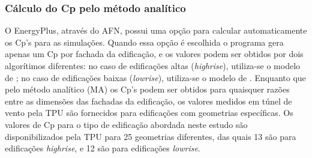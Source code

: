 \documentclass[brazil,hardcopy,openany,a5paper]{ufscthesis}
\begin{document}
%		
%		
%		
		\subsubsection{Cálculo do Cp pelo método analítico}
		
		O EnergyPlus, através do AFN, possui uma opção para calcular automaticamente os Cp's para as simulações.
		Quando essa opção é escolhida o programa gera apenas um Cp por fachada da edificação, e os valores podem ser obtidos por dois algorítimos diferentes: no caso de edificações altas (\textit{highrise}), utiliza-se o modelo de  \cite{Atkins}; no caso de edificações baixas (\textit{lowrise}), utiliza-se o modelo de  \cite{SwamiChandra}.
		Enquanto que pelo método analítico (MA) os Cp's podem ser obtidos para quaisquer razões entre as dimensões das fachadas da edificação, os valores medidos em túnel de vento pela TPU são fornecidos para edificações com geometrias específicas.  %
		Os valores de Cp para o tipo de edificação abordada neste estudo são disponibilizados pela TPU para 25 geometrias diferentes, das quais 13 são para edificações \textit{highrise}, e 12 são para edificações \textit{lowrise}.
		
\end{document}
